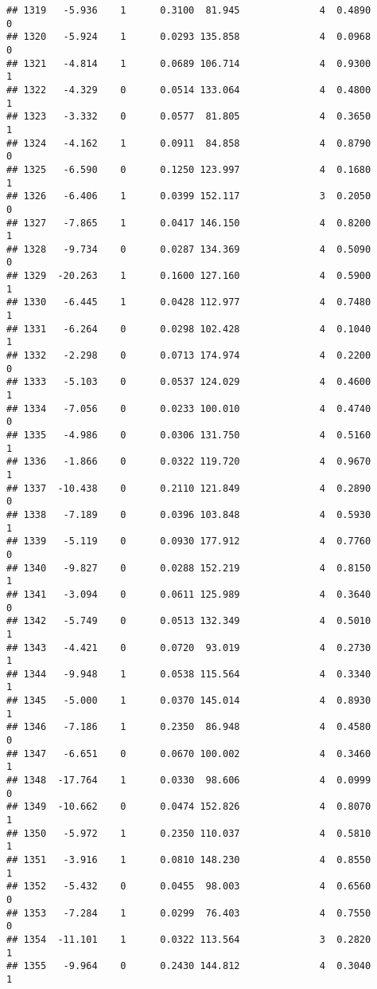 \documentclass[
]{article}
\begin{document}
\begin{verbatim}
## 1319   -5.936    1      0.3100  81.945              4  0.4890      0
## 1320   -5.924    1      0.0293 135.858              4  0.0968      0
## 1321   -4.814    1      0.0689 106.714              4  0.9300      1
## 1322   -4.329    0      0.0514 133.064              4  0.4800      1
## 1323   -3.332    0      0.0577  81.805              4  0.3650      1
## 1324   -4.162    1      0.0911  84.858              4  0.8790      0
## 1325   -6.590    0      0.1250 123.997              4  0.1680      1
## 1326   -6.406    1      0.0399 152.117              3  0.2050      0
## 1327   -7.865    1      0.0417 146.150              4  0.8200      1
## 1328   -9.734    0      0.0287 134.369              4  0.5090      0
## 1329  -20.263    1      0.1600 127.160              4  0.5900      1
## 1330   -6.445    1      0.0428 112.977              4  0.7480      1
## 1331   -6.264    0      0.0298 102.428              4  0.1040      1
## 1332   -2.298    0      0.0713 174.974              4  0.2200      0
## 1333   -5.103    0      0.0537 124.029              4  0.4600      1
## 1334   -7.056    0      0.0233 100.010              4  0.4740      0
## 1335   -4.986    0      0.0306 131.750              4  0.5160      1
## 1336   -1.866    0      0.0322 119.720              4  0.9670      1
## 1337  -10.438    0      0.2110 121.849              4  0.2890      0
## 1338   -7.189    0      0.0396 103.848              4  0.5930      1
## 1339   -5.119    0      0.0930 177.912              4  0.7760      0
## 1340   -9.827    0      0.0288 152.219              4  0.8150      1
## 1341   -3.094    0      0.0611 125.989              4  0.3640      0
## 1342   -5.749    0      0.0513 132.349              4  0.5010      1
## 1343   -4.421    0      0.0720  93.019              4  0.2730      1
## 1344   -9.948    1      0.0538 115.564              4  0.3340      1
## 1345   -5.000    1      0.0370 145.014              4  0.8930      1
## 1346   -7.186    1      0.2350  86.948              4  0.4580      0
## 1347   -6.651    0      0.0670 100.002              4  0.3460      1
## 1348  -17.764    1      0.0330  98.606              4  0.0999      0
## 1349  -10.662    0      0.0474 152.826              4  0.8070      1
## 1350   -5.972    1      0.2350 110.037              4  0.5810      1
## 1351   -3.916    1      0.0810 148.230              4  0.8550      1
## 1352   -5.432    0      0.0455  98.003              4  0.6560      0
## 1353   -7.284    1      0.0299  76.403              4  0.7550      0
## 1354  -11.101    1      0.0322 113.564              3  0.2820      1
## 1355   -9.964    0      0.2430 144.812              4  0.3040      1

\end{verbatim}
\end{document}
